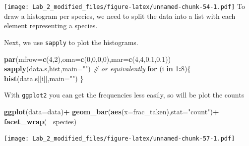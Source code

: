 \documentclass[11pt,]{article}
\newenvironment{Shaded}{\begin{snugshade}}{\end{snugshade}}
\newcommand{\KeywordTok}[1]{\textcolor[rgb]{0.13,0.29,0.53}{\textbf{#1}}}
\newcommand{\DataTypeTok}[1]{\textcolor[rgb]{0.13,0.29,0.53}{#1}}
\newcommand{\DecValTok}[1]{\textcolor[rgb]{0.00,0.00,0.81}{#1}}
\newcommand{\FloatTok}[1]{\textcolor[rgb]{0.00,0.00,0.81}{#1}}
\newcommand{\StringTok}[1]{\textcolor[rgb]{0.31,0.60,0.02}{#1}}
\newcommand{\CommentTok}[1]{\textcolor[rgb]{0.56,0.35,0.01}{\textit{#1}}}
\newcommand{\ControlFlowTok}[1]{\textcolor[rgb]{0.13,0.29,0.53}{\textbf{#1}}}
\newcommand{\OperatorTok}[1]{\textcolor[rgb]{0.81,0.36,0.00}{\textbf{#1}}}
\newcommand{\NormalTok}[1]{#1}
\begin{document}
\texttt{[image: Lab\_2\_modified\_files/figure-latex/unnamed-chunk-54-1.pdf]}
To draw a histogram per species, we need to split the data into a list
with each element representing a species.

\begin{Shaded}
\end{Shaded}

Next, we use \texttt{sapply} to plot the histograms.

\begin{Shaded}
\begin{Highlighting}[]
\KeywordTok{par}\NormalTok{(}\DataTypeTok{mfrow=}\KeywordTok{c}\NormalTok{(}\DecValTok{4}\NormalTok{,}\DecValTok{2}\NormalTok{),}\DataTypeTok{oma=}\KeywordTok{c}\NormalTok{(}\DecValTok{0}\NormalTok{,}\DecValTok{0}\NormalTok{,}\DecValTok{0}\NormalTok{,}\DecValTok{0}\NormalTok{),}\DataTypeTok{mar=}\KeywordTok{c}\NormalTok{(}\DecValTok{4}\NormalTok{,}\DecValTok{4}\NormalTok{,}\FloatTok{0.1}\NormalTok{,}\FloatTok{0.1}\NormalTok{))}
\KeywordTok{sapply}\NormalTok{(data.s,hist,}\DataTypeTok{main=}\StringTok{""}\NormalTok{)}
\CommentTok{# or equivalently}
\ControlFlowTok{for}\NormalTok{ (i }\ControlFlowTok{in} \DecValTok{1}\OperatorTok{:}\DecValTok{8}\NormalTok{)\{}
  \KeywordTok{hist}\NormalTok{(data.s[[i]],}\DataTypeTok{main=}\StringTok{""}\NormalTok{)}
\NormalTok{\}}
\end{Highlighting}
\end{Shaded}

With \texttt{ggplot2} you can get the frequencies less easily, so will
be plot the counts

\begin{Shaded}
\begin{Highlighting}[]
\KeywordTok{ggplot}\NormalTok{(}\DataTypeTok{data=}\NormalTok{data)}\OperatorTok{+}
\KeywordTok{geom_bar}\NormalTok{(}\KeywordTok{aes}\NormalTok{(}\DataTypeTok{x=}\NormalTok{frac_taken),}\DataTypeTok{stat=}\StringTok{"count"}\NormalTok{)}\OperatorTok{+}
\StringTok{  }\KeywordTok{facet_wrap}\NormalTok{(}\OperatorTok{~}\StringTok{ }\NormalTok{species)}
\end{Highlighting}
\end{Shaded}

\texttt{[image: Lab\_2\_modified\_files/figure-latex/unnamed-chunk-57-1.pdf]}
\end{document}
